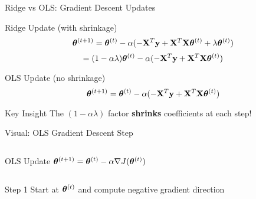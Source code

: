 \documentclass{beamer}
\begin{document}
\begin{frame}{Ridge vs OLS: Gradient Descent Updates}
\begin{theorembox}{Ridge Update (with shrinkage)}
$$\boldsymbol{\theta}^{(t+1)} = \boldsymbol{\theta}^{(t)} - \alpha(-\mathbf{X}^T\mathbf{y} + \mathbf{X}^T\mathbf{X}\boldsymbol{\theta}^{(t)} + \lambda\boldsymbol{\theta}^{(t)})$$
$$= (1 - \alpha\lambda)\boldsymbol{\theta}^{(t)} - \alpha(-\mathbf{X}^T\mathbf{y} + \mathbf{X}^T\mathbf{X}\boldsymbol{\theta}^{(t)})$$
\end{theorembox}
\pause

\begin{theorembox}{OLS Update (no shrinkage)}
$$\boldsymbol{\theta}^{(t+1)} = \boldsymbol{\theta}^{(t)} - \alpha(-\mathbf{X}^T\mathbf{y} + \mathbf{X}^T\mathbf{X}\boldsymbol{\theta}^{(t)})$$
\end{theorembox}
\pause

\begin{keypointsbox}{Key Insight}
The $(1 - \alpha\lambda)$ factor \textbf{shrinks} coefficients at each step!
\end{keypointsbox}
\end{frame}

\begin{frame}{Visual: OLS Gradient Descent Step}
\begin{columns}
\begin{theorembox}{OLS Update}
$\boldsymbol{\theta}^{(t+1)} = \boldsymbol{\theta}^{(t)} - \alpha \nabla J(\boldsymbol{\theta}^{(t)})$
\end{theorembox}

\begin{center}
\end{center}
\end{columns}

\begin{alertbox}{Step 1}
Start at $\boldsymbol{\theta}^{(t)}$ and compute negative gradient direction
\end{alertbox}
\end{frame}
\end{document}
